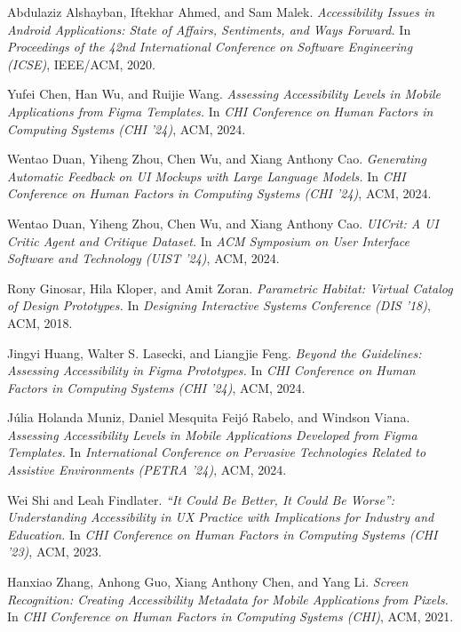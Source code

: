 \documentclass[12pt]{article}
\begin{document}
\renewcommand{\refname}{References}

\begin{thebibliography}{9}

Abdulaziz Alshayban, Iftekhar Ahmed, and Sam Malek.
\textit{Accessibility Issues in Android Applications: State of Affairs, Sentiments, and Ways Forward.}
In \textit{Proceedings of the 42nd International Conference on Software Engineering (ICSE)}, IEEE/ACM, 2020.

Yufei Chen, Han Wu, and Ruijie Wang.
\textit{Assessing Accessibility Levels in Mobile Applications from Figma Templates.}
In \textit{CHI Conference on Human Factors in Computing Systems (CHI ’24)}, ACM, 2024.

Wentao Duan, Yiheng Zhou, Chen Wu, and Xiang Anthony Cao.
\textit{Generating Automatic Feedback on UI Mockups with Large Language Models.}
In \textit{CHI Conference on Human Factors in Computing Systems (CHI ’24)}, ACM, 2024.

Wentao Duan, Yiheng Zhou, Chen Wu, and Xiang Anthony Cao.
\textit{UICrit: A UI Critic Agent and Critique Dataset.}
In \textit{ACM Symposium on User Interface Software and Technology (UIST ’24)}, ACM, 2024.

Rony Ginosar, Hila Kloper, and Amit Zoran.
\textit{Parametric Habitat: Virtual Catalog of Design Prototypes.}
In \textit{Designing Interactive Systems Conference (DIS ’18)}, ACM, 2018.

Jingyi Huang, Walter S. Lasecki, and Liangjie Feng.
\textit{Beyond the Guidelines: Assessing Accessibility in Figma Prototypes.}
In \textit{CHI Conference on Human Factors in Computing Systems (CHI ’24)}, ACM, 2024.

Júlia Holanda Muniz, Daniel Mesquita Feijó Rabelo, and Windson Viana.
\textit{Assessing Accessibility Levels in Mobile Applications Developed from Figma Templates.}
In \textit{International Conference on Pervasive Technologies Related to Assistive Environments (PETRA ’24)}, ACM, 2024.

Wei Shi and Leah Findlater.
\textit{“It Could Be Better, It Could Be Worse”: Understanding Accessibility in UX Practice with Implications for Industry and Education.}
In \textit{CHI Conference on Human Factors in Computing Systems (CHI ’23)}, ACM, 2023.

Hanxiao Zhang, Anhong Guo, Xiang Anthony Chen, and Yang Li.
\textit{Screen Recognition: Creating Accessibility Metadata for Mobile Applications from Pixels.}
In \textit{CHI Conference on Human Factors in Computing Systems (CHI)}, ACM, 2021.

\end{thebibliography}
\end{document}
